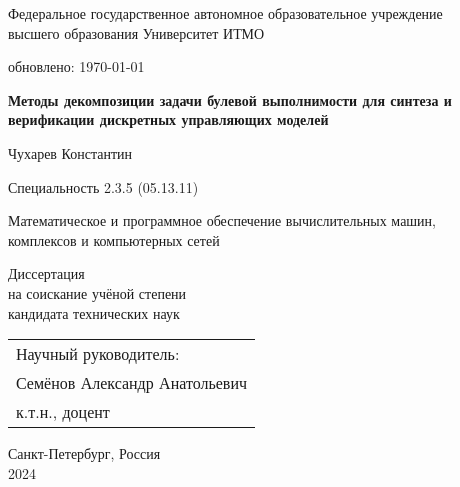 \thispagestyle{empty}

\begin{center}
    Федеральное государственное автономное образовательное учреждение \\
    высшего образования Университет ИТМО

    {\tiny обновлено: \today}
\end{center}

\vspace{0pt plus2fill}

\begin{center}

\textbf{\large
Методы декомпозиции задачи булевой выполнимости для синтеза и верификации дискретных управляющих моделей
}

\vspace{1cm}

{\large
    Чухарев Константин
}

\vspace{1cm}

Специальность 2.3.5 (05.13.11)

\begin{SingleSpace*}
    \small
    Математическое и программное обеспечение вычислительных машин, \\
    комплексов и компьютерных сетей
\end{SingleSpace*}

\vspace{1cm}

Диссертация \\
на соискание учёной степени \\
кандидата технических наук

\end{center}

\vspace{0pt plus1fill}

\hfill\begin{tabular}{l}
Научный руководитель: \\
Семёнов Александр Анатольевич \\
к.т.н., доцент
\end{tabular}

\vspace{0pt plus1fill}

\begin{center}
    Санкт-Петербург, Россия \\
    2024
\end{center}
